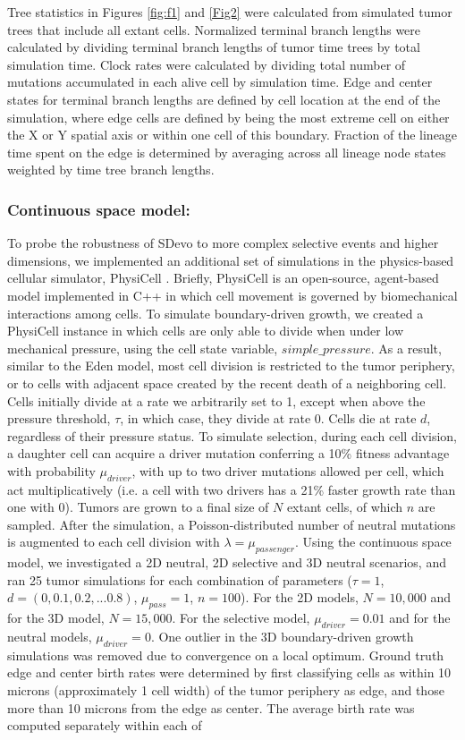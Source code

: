 \documentclass[12pt]{elife_based}
\begin{document}
Tree statistics in Figures \ref{fig:f1} and \ref{Fig2} were calculated from simulated tumor trees that include all extant cells. Normalized terminal branch lengths were calculated by dividing terminal branch lengths of tumor time trees by total simulation time. Clock rates were calculated by dividing total number of mutations accumulated in each alive cell by simulation time. Edge and center states for terminal branch lengths are defined by cell location at the end of the simulation, where edge cells are defined by being the most extreme cell on either the X or Y spatial axis or within one cell of this boundary. Fraction of the lineage time spent on the edge is determined by averaging across all lineage node states weighted by time tree branch lengths. 

\subsubsection*{Continuous space model:} To probe the robustness of SDevo to more complex selective events and higher dimensions, we implemented an additional set of simulations in the physics-based cellular simulator, PhysiCell \citep{ghaffarizadeh2018physicell}. Briefly, PhysiCell is an open-source, agent-based model implemented in C++ in which cell movement is governed by biomechanical interactions among cells. To simulate boundary-driven growth, we created a PhysiCell instance in which cells are only able to divide when under low mechanical pressure, using the cell state variable, $\textit{simple\_pressure}$. As a result, similar to the Eden model, most cell division is restricted to the tumor periphery, or to cells with adjacent space created by the recent death of a neighboring cell. Cells initially divide at a rate we arbitrarily set to 1, except when above the pressure threshold, $\tau$, in which case, they divide at rate 0. Cells die at rate $d$, regardless of their pressure status. To simulate selection, during each cell division, a daughter cell can acquire a driver mutation conferring a 10\% fitness advantage with probability $\mu_{driver}$, with up to two driver mutations allowed per cell, which act multiplicatively (i.e. a cell with two drivers has a 21\% faster growth rate than one with 0). Tumors are grown to a final size of $N$ extant cells, of which $n$ are sampled. After the simulation, a Poisson-distributed number of neutral mutations is augmented to each cell division with $\lambda = \mu_{passenger}$. Using the continuous space model, we investigated a 2D neutral, 2D selective and 3D neutral scenarios, and ran 25 tumor simulations for each combination of parameters ($\tau = 1$, $d = (0, 0.1, 0.2, ... 0.8)$, $\mu_{pass} = 1$, $n = 100$). For the 2D models, $N = 10,000$ and for the 3D model, $N = 15,000$. For the selective model, $\mu_{driver} = 0.01$ and for the neutral models, $\mu_{driver} = 0$. One outlier in the 3D boundary-driven growth simulations was removed due to convergence on a local optimum. Ground truth edge and center birth rates were determined by first classifying cells as within 10 microns (approximately 1 cell width) of the tumor periphery as edge, and those more than 10 microns from the edge as center. The average birth rate was computed separately within each of 
\end{document}

